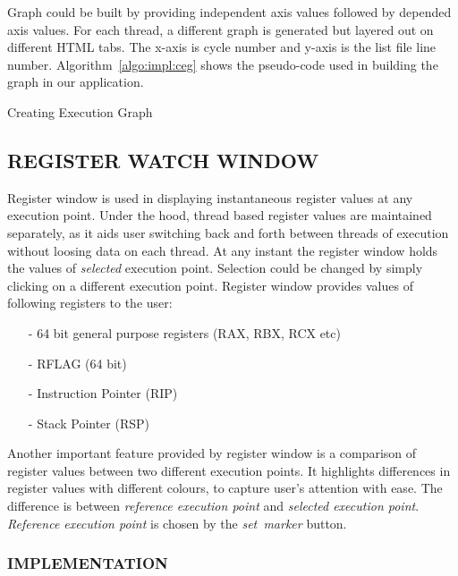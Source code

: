 Graph could be built by providing independent axis values followed by depended axis values. For each thread, a different graph is generated but layered out on different HTML tabs. The x-axis is cycle number and y-axis is the list file line number. Algorithm~\ref{algo:impl:ceg} shows the pseudo-code used in building the graph in our application.

\IncMargin{1em}
\begin{algorithm}[h]
\DontPrintSemicolon
{} 
\KwFn{}
\BlankLine
{}
\caption{Creating Execution Graph}
\label{algo:impl:ceg}
\end{algorithm}\DecMargin{1em}

\subsection {REGISTER WATCH WINDOW}
\label{sec:impl:rww}
Register window is used in displaying instantaneous register values at any execution point. Under the hood, thread based register values are maintained separately, as it aids user switching back and forth between threads of execution without loosing data on each thread. At any instant the register window holds the values of {\it selected} execution point. Selection could be changed by simply clicking on a different execution point. Register window provides values of following registers to the user:
\begin{itemize}
	\item[-] 64 bit general purpose registers (RAX, RBX, RCX etc)
	\item[-] RFLAG (64 bit)
	\item[-] Instruction Pointer (RIP)
	\item[-] Stack Pointer (RSP)
\end{itemize}

Another important feature provided by register window is a comparison of register values between two different execution points. It highlights differences in register values with different colours, to capture user's attention with ease. The difference is between {\it reference execution point} and {\it selected execution point}. {\it Reference execution point} is chosen by the {\it set~marker} button.

\subsubsection{IMPLEMENTATION}

